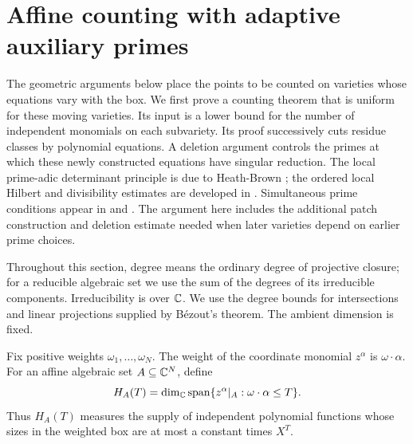 \section{Affine counting with adaptive auxiliary primes}
\label{sec:affine-counting}

The geometric arguments below place the points to be counted on varieties
whose equations vary with the box.  We first prove a counting theorem
that is uniform for these moving varieties.  Its input is a lower bound
for the number of independent monomials on each subvariety.  Its proof
successively cuts residue classes by polynomial equations.  A deletion
argument controls the primes at which these newly constructed equations
have singular reduction.
The local prime-adic determinant principle is due to Heath-Brown
\cite[Section~3, Lemmas~5--6]{HeathBrown2002Density}; the ordered local Hilbert
and divisibility estimates are developed in
\cite[Lemmas~2.3--2.5]{Salberger2007}. Simultaneous prime
conditions appear in \cite[Theorem~3.2]{Salberger2007} and
\cite[Section~2, Theorem~2.2]{Salberger2023}.
The argument here includes
the additional patch construction and deletion estimate needed when
later varieties depend on earlier prime choices.

Throughout this section, degree means the ordinary degree of projective
closure; for a reducible algebraic set we use the sum of the degrees of
its irreducible components.  Irreducibility is over $\mathbb C$.  We use the
degree bounds for intersections and linear projections supplied by
B\'ezout's theorem.  The ambient dimension is fixed.

Fix positive weights $\omega_1,\ldots,\omega_N$.  The weight of the
coordinate monomial $z^\alpha$ is $\omega\cdot\alpha$.  For an affine
algebraic set $A\subseteq\mathbb C^N$, define
\[
 H_A(T)=\dim_{\mathbb C}\operatorname{span}
 \{z^\alpha|_A:\omega\cdot\alpha\le T\}.
\]
Thus $H_A(T)$ measures the supply of independent polynomial functions
whose sizes in the weighted box are at most a constant times $X^T$.

